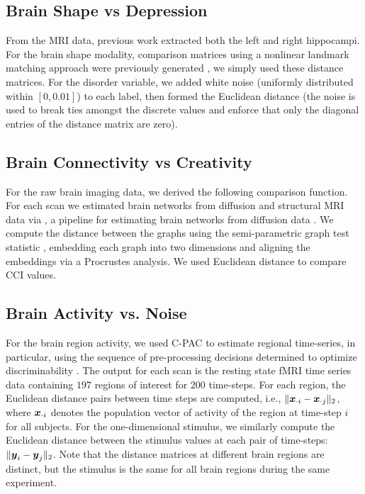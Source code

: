\documentclass[11pt]{article}
\begin{document}
\subsection{Brain Shape vs Depression}

From the MRI data, previous work extracted both the left and right hippocampi. For the brain shape modality, comparison matrices using a nonlinear landmark matching approach were previously generated \cite{ParkEtAl2008,BegEtAl2005}, we simply used these distance matrices. For the disorder variable, we added white noise (uniformly distributed within $[0,0.01]$) to each label,
then formed the Euclidean distance (the noise is used to break ties amongst the discrete values and enforce that only the diagonal entries of the distance matrix are zero).

\subsection{Brain Connectivity vs Creativity}


For the raw brain imaging data, we derived the following comparison function.  For each scan we estimated brain networks from diffusion and structural MRI data via  \Migraine, a pipeline for estimating brain networks from diffusion data \cite{GrayRoncal2013}.
We compute the distance between the graphs using the semi-parametric graph test statistic \cite{Sussman2013,ShenVogelsteinPriebe2016,Tang2016}, embedding each graph into two dimensions and aligning the embeddings via a Procrustes analysis. We used Euclidean distance to compare CCI values. 





\subsection{Brain Activity vs. Noise}

For the brain region activity, we used C-PAC to estimate regional time-series, in particular, using the sequence of pre-processing decisions determined to optimize discriminability \cite{Wang2016}.  The output for each scan is the resting state fMRI time series data containing $197$ regions of interest for $200$ time-steps.
For each region, the Euclidean distance pairs between time steps are computed, i.e., $\|\boldsymbol{x}_{\cdot i}-\boldsymbol{x}_{\cdot j}\|_2$,  where $\boldsymbol{x}_{\cdot i}$ denotes the population vector of activity of the region at time-step $i$ for all subjects.
For the one-dimensional stimulus, we similarly compute the Euclidean distance between the stimulus values at each pair of time-steps: $\|\boldsymbol{y}_i - \boldsymbol{y}_j\|_2$.
Note that the distance matrices at different brain regions are distinct, but the stimulus is the same for all brain regions during the same experiment.
\end{document}
